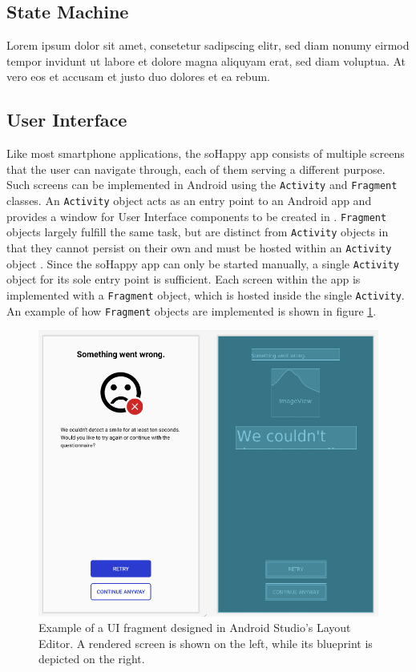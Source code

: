 \subsection{State Machine}
Lorem ipsum dolor sit amet, consetetur sadipscing elitr, sed diam nonumy eirmod tempor invidunt ut labore et dolore magna aliquyam erat, sed diam voluptua. At vero eos et accusam et justo duo dolores et ea rebum.

\subsection{User Interface} \label{sec:user_interface}
Like most smartphone applications, the soHappy app consists of multiple screens that the user can navigate through, each of them serving a different purpose. Such screens can be implemented in Android using the \texttt{Activity} and \texttt{Fragment} classes. An \texttt{Activity} object acts as an entry point to an Android app and provides a window for User Interface components to be created in \cite{intro_to_activities}. \texttt{Fragment} objects largely fulfill the same task, but are distinct from \texttt{Activity} objects in that they cannot persist on their own and must be hosted within an \texttt{Activity} object \cite{intro_to_fragments}. Since the soHappy app can only be started manually, a single \texttt{Activity} object for its sole entry point is sufficient. Each screen within the app is implemented with a \texttt{Fragment} object, which is hosted inside the single \texttt{Activity}. An example of how \texttt{Fragment} objects are implemented is shown in figure \ref{fig:user_interface}.

\begin{figure}
  \includegraphics[width=\linewidth]{figures/user_interface.png}
  \caption{Example of a UI fragment designed in Android Studio's Layout Editor. A rendered screen is shown on the left, while its blueprint is depicted on the right.}
  \label{fig:user_interface}
\end{figure}

